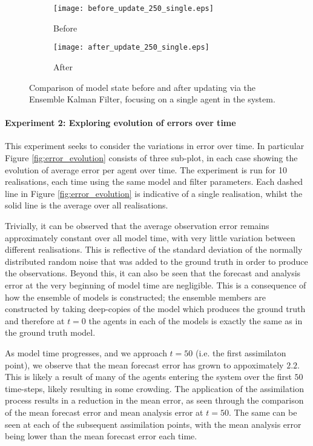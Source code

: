 \begin{figure}[!htb]
    \centering
    \begin{subfigure}[h]{\textwidth}
        \texttt{[image: before\_update\_250\_single.eps]}
        \caption{Before}\label{fig:before_250_single}
    \end{subfigure}

    \begin{subfigure}[h]{\textwidth}
        \texttt{[image: after\_update\_250\_single.eps]}
        \caption{After}\label{fig:after_250_single}
    \end{subfigure}
    \caption{Comparison of model state before and after updating via the
    Ensemble Kalman Filter, focusing on a single agent in the system.}
    \label{fig:250_single}
\end{figure}

\paragraph{Experiment 2: Exploring evolution of errors over time}

This experiment seeks to consider the variations in error over time.
In particular Figure \ref{fig:error_evolution} consists of three sub-plot, in
each case showing the evolution of average error per agent over time.
The experiment is run for 10 realisations, each time using the same model and
filter parameters.
Each dashed line in Figure \ref{fig:error_evolution} is indicative of a single
realisation, whilst the solid line is the average over all realisations.

Trivially, it can be observed that the average observation error remains
approximately constant over all model time, with very little variation between
different realisations.
This is reflective of the standard deviation of the normally distributed random
noise that was added to the ground truth in order to produce the observations.
Beyond this, it can also be seen that the forecast and analysis error at the
very beginning of model time are negligible.
This is a consequence of how the ensemble of models is constructed; the ensemble
members are constructed by taking deep-copies of the model which produces the
ground truth and therefore at $t=0$ the agents in each of the models is exactly
the same as in the ground truth model.

As model time progresses, and we approach $t=50$ (i.e. the first assimilaton
point), we observe that the mean forecast error has grown to appoximately $2.2$.
This is likely a result of many of the agents entering the system over the first
$50$ time-steps, likely resulting in some crowding.
The application of the assimilation process results in a reduction in the mean
error, as seen through the comparison of the mean forecast error and mean
analysis error at $t=50$.
The same can be seen at each of the subsequent assimilation points, with the
mean analysis error being lower than the mean forecast error each time.

